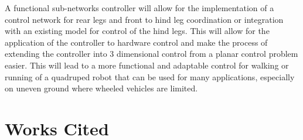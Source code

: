 \documentclass[12pt, letterpaper, oneside, notitlepage, onecolumn]{article}
\begin{document}
A functional sub-networks controller will allow for the implementation of a control network for rear legs and front to hind leg coordination or integration with an existing model for control of the hind legs. This will allow for the application of the controller to hardware control and make the process of extending the controller into 3 dimensional control from a planar control problem easier. This will lead to a more functional and adaptable control for walking or running of a quadruped robot that can be used for many applications, especially on uneven ground where wheeled vehicles are limited.

\newpage

\section{Works Cited}




\end{document}
